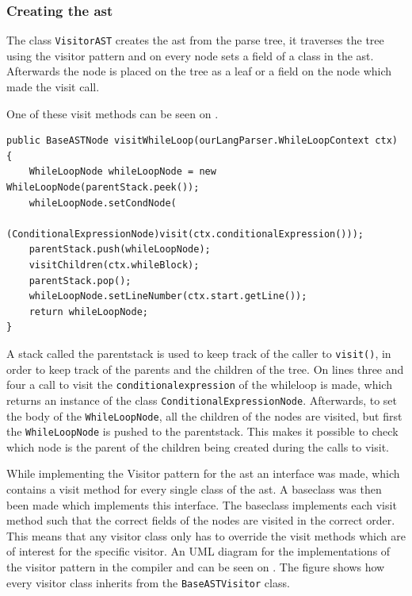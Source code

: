\subsubsection*{Creating the \acrshort{ast}}

The class \texttt{VisitorAST} creates the \acrshort{ast} from the parse tree, it traverses the tree using the visitor pattern and on every node sets a field of a class in the \acrshort{ast}. 
Afterwards the node is placed on the tree as a leaf or a field on the node which made the visit call.

One of these visit methods can be seen on .

\begin{lstlisting}[caption=The visit method for WhileLoopNode,frame=tlrb,label={lst:VisitorASTCode}]
public BaseASTNode visitWhileLoop(ourLangParser.WhileLoopContext ctx) {
    WhileLoopNode whileLoopNode = new WhileLoopNode(parentStack.peek());
    whileLoopNode.setCondNode(
    	(ConditionalExpressionNode)visit(ctx.conditionalExpression()));
    parentStack.push(whileLoopNode);
    visitChildren(ctx.whileBlock);
    parentStack.pop();
    whileLoopNode.setLineNumber(ctx.start.getLine());
    return whileLoopNode;
}
\end{lstlisting}
A stack called the parentstack is used to keep track of the caller to \texttt{visit()}, in order to keep track of the parents and the children of the tree.
On lines three and four a call to visit the \texttt{conditionalexpression} of the whileloop is made, which returns an instance of the class \texttt{ConditionalExpressionNode}.
Afterwards, to set the body of the \texttt{WhileLoopNode}, all the children of the nodes are visited, but first the \texttt{WhileLoopNode} is pushed to the parentstack.
This makes it possible to check which node is the parent of the children being created during the calls to visit.

While implementing the Visitor pattern for the \acrshort{ast} an interface was made, which contains a visit method for every single class of the \acrshort{ast}.
A baseclass was then been made which implements this interface.
The baseclass implements each visit method such that the correct fields of the nodes are visited in the correct order.
This means that any visitor class only has to override the visit methods which are of interest for the specific visitor.
An UML diagram for the implementations of the visitor pattern in the compiler and can be seen on .
The figure shows how every visitor class inherits from the \texttt{BaseASTVisitor} class.

